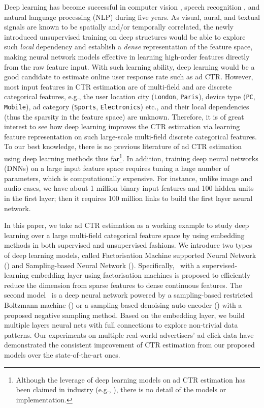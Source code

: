 \documentclass{llncs}
\newcommand{\ft}{\texttt}
\newcommand{\fmnn}{\text{FNN}}
\newcommand{\snn}{\text{SNN}}
\newcommand{\snnrbm}{\text{SNN-RBM}}
\newcommand{\snndae}{\text{SNN-DAE}}
\begin{document}
Deep learning \cite{lecun2015deep} has become successful in computer vision \cite{krizhevsky2012imagenet},  speech recognition \cite{graves2013speech}, and natural language processing (NLP) \cite{huang2013learning,shen2014latent} during  five years. As visual, aural, and textual signals are known to be spatially and/or temporally correlated, the newly introduced unsupervised training on deep structures \cite{hinton2006reducing} would be able to explore such \emph{local} dependency and establish a \emph{dense} representation of the feature space, making neural network models effective in learning high-order features directly from the raw feature input.  With such learning ability, deep learning would be a good candidate to estimate online user response rate such as ad CTR. However, most input features in CTR estimation are of multi-field and are discrete categorical features, e.g., the user location city (\ft{London}, \ft{Paris}), device type (\ft{PC}, \ft{Mobile}), ad category (\ft{Sports}, \ft{Electronics}) etc., and their local dependencies (thus the sparsity in the feature space) are unknown.  Therefore, it is of great interest to see how deep learning improves the CTR estimation via learning feature representation on such large-scale multi-field discrete categorical features. To our best knowledge, there is no previous literature of ad CTR estimation using deep learning methods thus far\footnote{Although the leverage of deep learning models on ad CTR estimation has been claimed in industry (e.g., \cite{zou2014mariana}), there is no detail of the models or implementation.}. In addition, training deep neural networks (DNNs) on a large input feature space requires tuning a huge number of parameters, which is computationally expensive. For instance, unlike image and audio cases, we have about 1 million binary input features and 100 hidden units in the first layer; then it requires 100 million links to build the first layer neural network.

In this paper, we take ad CTR estimation as a working example to study deep learning over a large multi-field categorical feature space by using embedding methods in both supervised and unsupervised fashions. We introduce two types of deep learning models, called Factorisation Machine supported Neural Network (\fmnn) and Sampling-based Neural Network (\snn). Specifically, \fmnn~with a supervised-learning embedding layer using factorisation machines \cite{rendle2012factorization} is proposed to efficiently reduce the dimension from sparse features to dense continuous features. The second model \snn~is a deep neural network powered by a sampling-based restricted Boltzmann machine (\snnrbm) or a sampling-based denoising auto-encoder (\snndae) with a proposed negative sampling method. Based on the embedding layer, we build multiple layers neural nets with full connections to explore non-trivial data patterns. Our experiments on multiple real-world advertisers' ad click data have demonstrated the consistent improvement of CTR estimation from our proposed models over the state-of-the-art ones.
\end{document}
